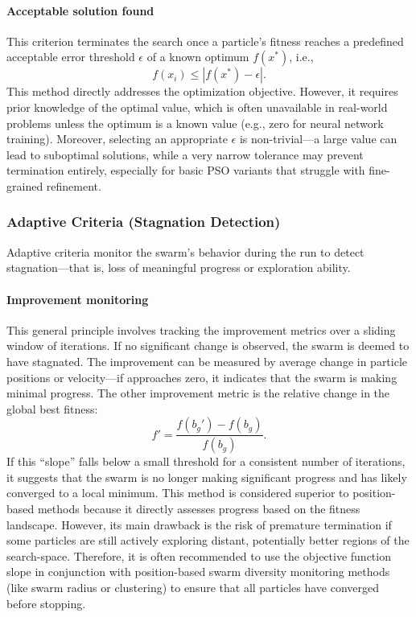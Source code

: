 {\paragraph{Acceptable solution found}
This criterion terminates the search once a particle's fitness reaches a predefined acceptable error threshold 
$\epsilon$ of a known optimum $f(x^*)$, i.e.,
\begin{equation}
    f(x_i) \le | f(x^*) - \epsilon |.
\end{equation}
This method directly addresses the optimization objective. However, it requires prior knowledge of the optimal value, which is often unavailable in real-world problems unless the optimum is a known value (e.g., zero for neural network training). Moreover, selecting an appropriate $\epsilon$ is non-trivial---a large value can lead to suboptimal solutions, while a very narrow tolerance may prevent termination entirely, especially for basic PSO variants that struggle with fine-grained refinement.

\subsubsection{Adaptive Criteria (Stagnation Detection)}

Adaptive criteria monitor the swarm’s behavior during the run to detect stagnation---that is, loss of meaningful progress or exploration ability.

\paragraph{Improvement monitoring}

This general principle involves tracking the improvement metrics over a sliding window of iterations. If no significant change is observed, the swarm is deemed to have stagnated. The improvement can be measured by average change in particle positions or velocity---if approaches zero, it indicates that the swarm is making minimal progress.
The other improvement metric is the relative change in the global best fitness:
\begin{equation}
      f' = \frac{f(b_g') - f(b_g)}{f(b_g)}.
\end{equation}
If this ``slope'' falls below a small threshold for a consistent number of iterations, it suggests that the swarm is no longer making significant progress and has likely converged to a local minimum. This method is considered superior to position-based methods because it directly assesses progress based on the fitness landscape. However, its main drawback is the risk of premature termination if some particles are still actively exploring distant, potentially better regions of the \gls{search-space}. Therefore, it is often recommended to use the objective function slope in conjunction with position-based swarm diversity monitoring methods (like swarm radius or clustering) to ensure that all particles have converged before stopping. 


}
